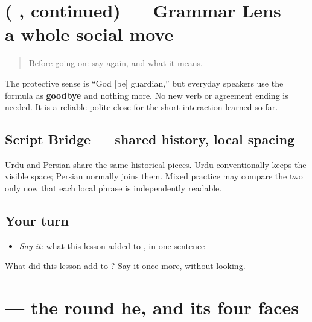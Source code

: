 \section[\texorpdfstring{(\ur{خدا} \ur{حافظ}, continued)}{(خدا حافظ, continued)}]{( , continued) — Grammar Lens — a whole social move}

\label{lesson:UR-C05-khuda-hafiz-more}



\begin{quote}
Before going on: say \textbf{ } again, and what it means.
\end{quote}

\begin{grammarlens}[title={Grammar Lens — a whole social move}]
The protective sense is “God {[}be{]} guardian,” but everyday speakers use the formula as \textbf{goodbye} and nothing more. No new verb or agreement ending is needed. It is a reliable polite close for the short interaction learned so far.
\end{grammarlens}

\subsection*{Script Bridge — shared history, local spacing}
Urdu \textbf{ } and Persian \textbf{} share the same historical pieces. Urdu conventionally keeps the visible space; Persian normally joins them. Mixed practice may compare the two only now that each local phrase is independently readable.

\subsection*{Your turn}
\begin{itemize}
\raggedright
  \item \emph{Say it:} what this lesson added to \textbf{ }, in one sentence
\end{itemize}

\begin{tcolorbox}[breakable,colback=teal!4,colframe=teal!35!black,title={Before you move on}]
What did this lesson add to \textbf{ }? Say it once more, without looking.
\end{tcolorbox}
\section[\texorpdfstring{\ur{ہ} (gol he)}{ہ (gol he)}]{ — the round he, and its four faces}

